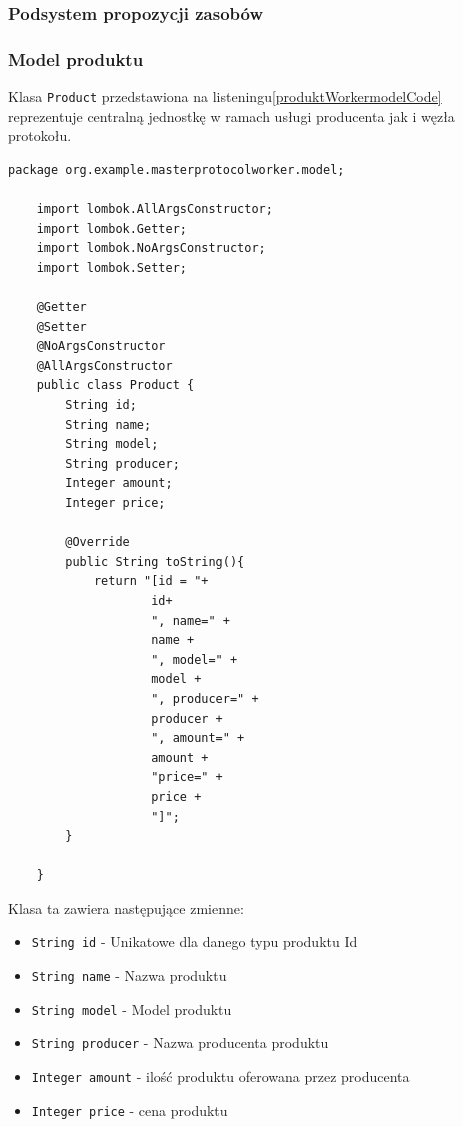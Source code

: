 \subsubsection{Podsystem propozycji zasobów}

\subsubsection{Model produktu}

Klasa \verb|Product| przedstawiona na listeningu\ref{produktWorkermodelCode} reprezentuje centralną jednostkę w ramach usługi producenta jak i węzła protokołu.

\begin{lstlisting}[caption=Klasa reprezentująca produkt, label=produktWorkermodelCode]
    package org.example.masterprotocolworker.model;
    
    import lombok.AllArgsConstructor;
    import lombok.Getter;
    import lombok.NoArgsConstructor;
    import lombok.Setter;
    
    @Getter
    @Setter
    @NoArgsConstructor
    @AllArgsConstructor
    public class Product {
        String id;
        String name;
        String model;
        String producer;
        Integer amount;
        Integer price;
    
        @Override
        public String toString(){
            return "[id = "+
                    id+
                    ", name=" +
                    name +
                    ", model=" +
                    model +
                    ", producer=" +
                    producer +
                    ", amount=" +
                    amount +
                    "price=" +
                    price +
                    "]";
        }
    
    }
\end{lstlisting}

Klasa ta zawiera następujące zmienne:
\begin{itemize}
    \item \verb|String id| - Unikatowe dla danego typu produktu Id
    \item \verb|String name| - Nazwa produktu
    \item \verb|String model| - Model produktu
    \item \verb|String producer| - Nazwa producenta produktu
    \item \verb|Integer amount| - ilość produktu oferowana przez producenta
    \item \verb|Integer price| - cena produktu
\end{itemize}

